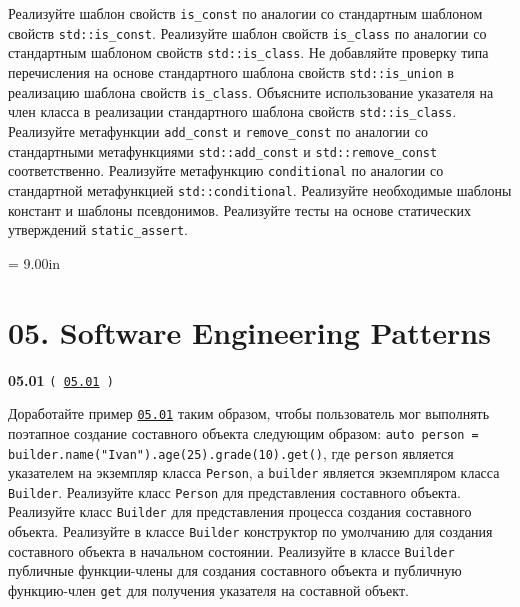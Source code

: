 \documentclass[a4paper,12pt]{article}
\begin{document}
Реализуйте шаблон свойств \lstinline{is_const} по аналогии со стандартным шаблоном свойств \lstinline{std::is_const}. Реализуйте шаблон свойств \lstinline{is_class} по аналогии со стандартным шаблоном свойств \lstinline{std::is_class}. Не добавляйте проверку типа перечисления на основе стандартного шаблона свойств \lstinline{std::is_union} в реализацию шаблона свойств \lstinline{is_class}. Объясните использование указателя на член класса в реализации стандартного шаблона свойств \lstinline{std::is_class}. Реализуйте метафункции \lstinline{add_const} и \lstinline{remove_const} по аналогии со стандартными метафункциями \lstinline{std::add_const} и \lstinline{std::remove_const} соответственно. Реализуйте метафункцию \lstinline{conditional} по аналогии со стандартной метафункцией \lstinline{std::conditional}. Реализуйте необходимые шаблоны констант и шаблоны псевдонимов. Реализуйте тесты на основе статических утверждений \lstinline{static_assert}.



\newpage\thispagestyle{empty}\pdfpageheight = 9.00in\enlargethispage{100in}

\section{05. Software Engineering Patterns}

{\large \textbf{05.01} \texttt{(\,\href{https://github.com/i-s-m-mipt/Education/blob/master/projects/examples/source/05.01.cpp}{05.01}\,)}}

\bigskip

Доработайте пример \href{https://github.com/i-s-m-mipt/Education/blob/master/projects/examples/source/05.01.cpp}{\texttt{05.01}} таким образом, чтобы пользователь мог выполнять поэтапное создание составного объекта следующим образом: \lstinline{auto person = builder.name("Ivan").age(25).grade(10).get()}, где \lstinline{person} является указателем на экземпляр класса \lstinline{Person}, а \lstinline{builder} является экземпляром класса \lstinline{Builder}. Реализуйте класс \lstinline{Person} для представления составного объекта. Реализуйте класс \lstinline{Builder} для представления процесса создания составного объекта. Реализуйте в классе \lstinline{Builder} конструктор по умолчанию для создания составного объекта в начальном состоянии. Реализуйте в классе \lstinline{Builder} публичные функции-члены для создания составного объекта и публичную функцию-член \lstinline{get} для получения указателя на составной объект.
\end{document}
